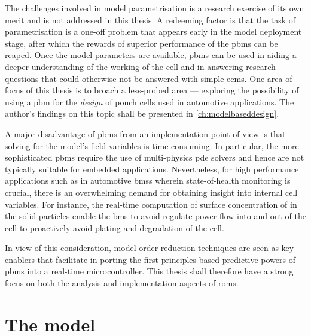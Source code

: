 The challenges involved  in model parametrisation is a research  exercise of its
own merit and  is not addressed in  this thesis. A redeeming factor  is that the
task of  parametrisation is a  one-off problem that  appears early in  the model
deployment  stage,  after which  the  rewards  of  superior performance  of  the
\glspl{pbm} can be reaped. Once  the model parameters are available, \glspl{pbm}
can be used in  aiding a deeper understanding of the working of  the cell and in
answering research  questions that could  otherwise not be answered  with simple
\glspl{ecm}. One area  of focus of this  thesis is to broach  a less-probed area
--- exploring  the possibility  of using  a \gls{pbm}  for the  \emph{design} of
pouch cells used in automotive applications. The author's findings on this topic
shall be presented in \cref{ch:modelbaseddesign}.

A major disadvantage of \glspl{pbm} from an implementation point of view is that
solving for  the model's field  variables is time-consuming. In  particular, the
more  sophisticated  \glspl{pbm}  require  the use  of  multi-physics  \gls{pde}
solvers  and  hence  are  not  typically  suitable  for  embedded  applications.
Nevertheless,  for   high  performance   applications  such  as   in  automotive
\glspl{bms}  wherein   state-of-health  monitoring  is  crucial,   there  is  an
overwhelming  demand for  obtaining insight  into internal  cell variables.  For
instance, the real-time computation of surface concentration of  in the
solid particles enable  the \gls{bms} to avoid regulate power  flow into and out
of the cell to proactively avoid plating and degradation of the cell.

In view of this consideration, model  order reduction techniques are seen as key
enablers that facilitate in porting the first-principles based predictive powers
of \glspl{pbm}  into a  real-time microcontroller.  This thesis  shall therefore
have  a  strong  focus  on  both the  analysis  and  implementation  aspects  of
\glspl{rom}.

\section{The  model}\label{sec:dfnmodel}

